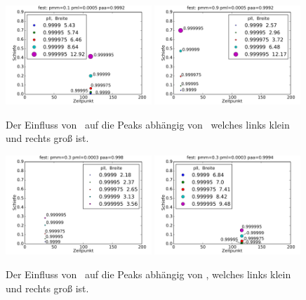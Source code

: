 \begin{figure}[]
\includegraphics[width=0.49\textwidth]{bilder/pll/3fest_01_00005_09992_p}
\includegraphics[width=0.49\textwidth]{bilder/pll/3fest_09_00005_09992_p}

\caption[Der Einfluss von \pll\ auf die Peaks abhängig von \pmm]{Der Einfluss von \pll\ auf die Peaks abhängig von \pmm\, welches links klein und rechts groß ist.}
\label{einfluss_pll_pmm}
\end{figure}

\begin{figure}[h]
\includegraphics[width=0.49\textwidth]{bilder/pll/3fest_03_00003_0998_p}
\includegraphics[width=0.49\textwidth]{bilder/pll/3fest_03_00003_09994_p}
\caption[Der Einfluss von \pll\ auf die Peaks abhängig von \paa]{Der Einfluss von \pll\ auf die Peaks abhängig von \paa, welches links klein und rechts groß ist.}
\label{einfluss_pll_paa}
\end{figure}

